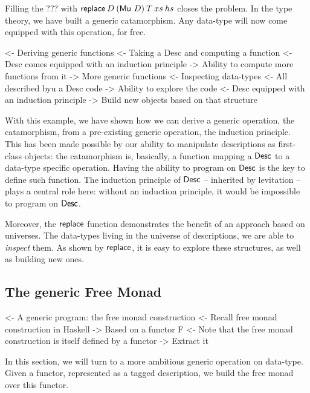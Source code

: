 Filling the \(???\) with \(\F{replace}\: D\: (\Mu{D})\: T\: xs\: hs\) closes the
problem. In the type theory, we have built a generic catamorphism. Any
data-type will now come equipped with this operation, for free.

\begin{wstructure}
<- Deriving generic functions
    <- Taking a Desc and computing a function
        <- Desc comes equipped with an induction principle
        -> Ability to compute more functions from it
            -> More generic functions
    <- Inspecting data-types
        <- All described byu a Desc code
        -> Ability to explore the code
            <- Desc equipped with an induction principle
            -> Build new objects based on that structure
\end{wstructure}

With this example, we have shown how we can derive a generic
operation, the catamorphism, from a pre-existing generic operation,
the induction principle. This has been made possible by our ability to
manipulate descriptions as first-class objects: the catamorphism is,
basically, a function mapping a $\Desc$ to a data-type specific
operation. Having the ability to program on $\Desc$ is the key to
define such function. The induction principle of $\Desc$ -- inherited
by levitation -- plays a central role here: without an induction
principle, it would be impossible to program on $\Desc$.

Moreover, the $\F{replace}$ function demonstrates the benefit of an
approach based on universes. The data-types living in the universe of
descriptions, we are able to \emph{inspect} them. As shown by
$\F{replace}$, it is easy to explore these structures, as well as
building new ones.

\subsection{The generic Free Monad}
\label{sec:desc-free-monad}

\begin{wstructure}
<- A generic program: the free monad construction
    <- Recall free monad construction in Haskell
        -> Based on a functor F
    <- Note that the free monad construction is itself defined by a functor
        -> Extract it
\end{wstructure}

In this section, we will turn to a more ambitious generic operation on
data-type. Given a functor, represented as a tagged description, we
build the free monad over this functor.

